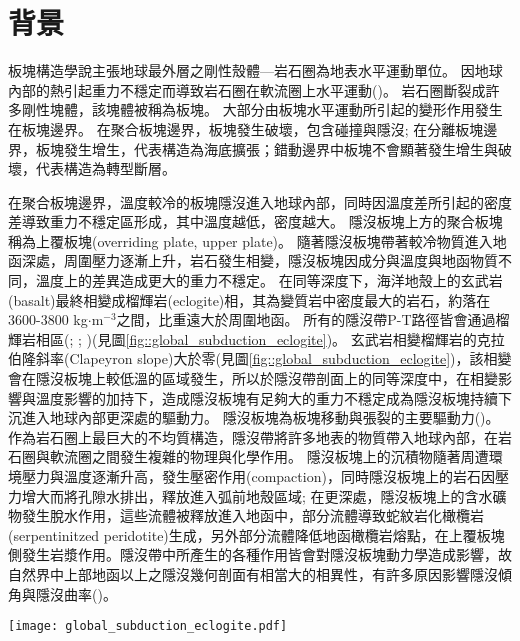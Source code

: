 \section{背景}\label{背景}

板塊構造學說主張地球最外層之剛性殼體---岩石圈為地表水平運動單位。
因地球內部的熱引起重力不穩定而導致岩石圈在軟流圈上水平運動(\citealp{jordan1978composition})。
岩石圈斷裂成許多剛性塊體，該塊體被稱為板塊。
大部分由板塊水平運動所引起的變形作用發生在板塊邊界。
在聚合板塊邊界，板塊發生破壞，包含碰撞與隱沒; 在分離板塊邊界，板塊發生增生，代表構造為海底擴張；錯動邊界中板塊不會顯著發生增生與破壞，代表構造為轉型斷層。

在聚合板塊邊界，溫度較冷的板塊隱沒進入地球內部，同時因溫度差所引起的密度差導致重力不穩定區形成，其中溫度越低，密度越大。
隱沒板塊上方的聚合板塊稱為上覆板塊(overriding plate, upper plate)。
隨著隱沒板塊帶著較冷物質進入地函深處，周圍壓力逐漸上升，岩石發生相變，隱沒板塊因成分與溫度與地函物質不同，溫度上的差異造成更大的重力不穩定。
在同等深度下，海洋地殼上的玄武岩(basalt)最終相變成榴輝岩(eclogite)相，其為變質岩中密度最大的岩石，約落在3600-3800 kg$\cdot$m$^{-3}$之間，比重遠大於周圍地函。
所有的隱沒帶P-T路徑皆會通過榴輝岩相區(\citealp{gerya2002exhumation}; \citealp{syracuse2010global}; \citealp{penniston2015global})(見圖\ref{fig::global_subduction_eclogite})。
玄武岩相變榴輝岩的克拉伯隆斜率(Clapeyron slope)大於零(見圖\ref{fig::global_subduction_eclogite})，該相變會在隱沒板塊上較低溫的區域發生，所以於隱沒帶剖面上的同等深度中，在相變影響與溫度影響的加持下，造成隱沒板塊有足夠大的重力不穩定成為隱沒板塊持續下沉進入地球內部更深處的驅動力。
隱沒板塊為板塊移動與張裂的主要驅動力(\citealp{turcotte2002geodynamics})。
作為岩石圈上最巨大的不均質構造，隱沒帶將許多地表的物質帶入地球內部，在岩石圈與軟流圈之間發生複雜的物理與化學作用。
隱沒板塊上的沉積物隨著周遭環境壓力與溫度逐漸升高，發生壓密作用(compaction)，同時隱沒板塊上的岩石因壓力增大而將孔隙水排出，釋放進入弧前地殼區域; 在更深處，隱沒板塊上的含水礦物發生脫水作用，這些流體被釋放進入地函中，部分流體導致蛇紋岩化橄欖岩(serpentinitzed peridotite)生成，另外部分流體降低地函橄欖岩熔點，在上覆板塊側發生岩漿作用。隱沒帶中所產生的各種作用皆會對隱沒板塊動力學造成影響，故自然界中上部地函以上之隱沒幾何剖面有相當大的相異性，有許多原因影響隱沒傾角與隱沒曲率(\citealp{schellart2020control})。

\begin{figure*}[ht!]
    \centering
    \texttt{[image: global\_subduction\_eclogite.pdf]}
    \caption[全球隱沒板塊頂部的預測P-T路徑圖，摘自\citealp{penniston2015global}]{
    全球隱沒板塊頂部的預測P-T路徑圖，摘自\citealp{penniston2015global}。圖中標示每公里5$^\circ$、10$^\circ$、20$^\circ$的地溫梯度與藍閃岩、榴輝岩溫壓位置。(A)來自\citealp{syracuse2010global}的全球隱沒板塊P-T路徑圖(紫色線)。(B)來自\citealp{gerya2002exhumation}的模型，紅色線代表不同年齡的隱沒板塊P-T路徑圖。
    }
    \label{fig::global_subduction_eclogite}
\end{figure*}


